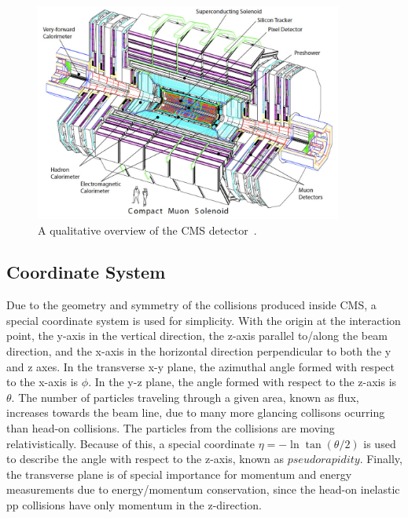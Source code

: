 \begin{figure}[hbtp]
 \begin{center}
   \includegraphics[width=0.9\textwidth]{ch3_figs/cms_overview_white.pdf}
   \caption[Overview of the CMS detector]{A qualitative overview of the CMS detector~\cite{cms_bluebook}.\label{fig:cms_overview}}
 \end{center}
\end{figure}

\subsection{Coordinate System}
Due to the geometry and symmetry of the collisions produced inside CMS, a special coordinate system is used for simplicity. With the origin at the interaction point,
the y-axis in the vertical direction, the z-axis parallel to/along the beam direction, and the x-axis in the horizontal direction perpendicular to both the y
and z axes. In the transverse x-y plane, the azimuthal angle formed with respect to the x-axis is $\phi$. In the y-z plane, the angle formed with respect to the z-axis
is $\theta$. The number of particles traveling through a given area, known as flux, increases towards the beam line, due to many more glancing collisons ocurring
than head-on collisions. The particles from the collisions are moving relativistically. Because of this, a special coordinate $\eta = -\ln\tan(\theta/2)$ 
is used to describe the angle with respect to the z-axis, known as $pseudorapidity$. 
Finally, the transverse plane is of special importance for momentum and energy measurements due to energy/momentum conservation, since the head-on inelastic
pp collisions have only momentum in the z-direction.

